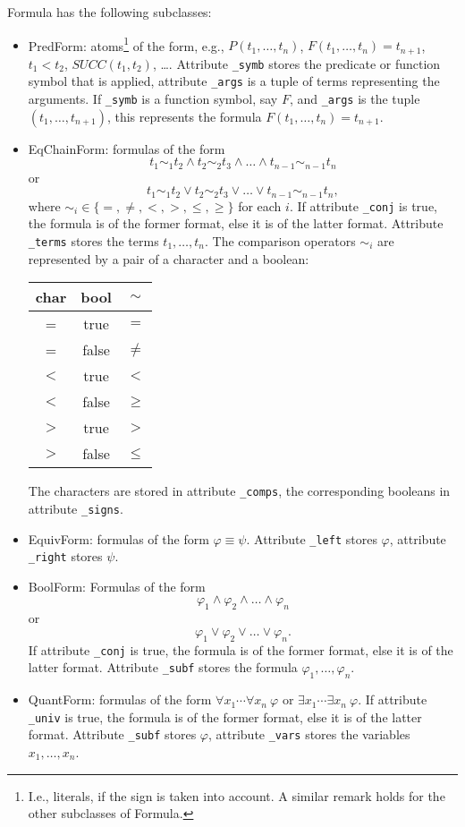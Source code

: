 \documentclass{article}
\begin{document}
Formula has the following subclasses:
\begin{itemize}
	\item PredForm: atoms\footnote{I.e., literals, if the sign is taken into account. A similar remark holds for the other subclasses of Formula.} of the form, e.g., $P(t_1,\ldots,t_n)$, $F(t_1,\ldots,t_n) = t_{n+1}$, $t_1 < t_2$, $SUCC(t_1,t_2)$, \ldots. Attribute \texttt{\_symb} stores the predicate or function symbol that is applied, attribute \texttt{\_args} is a tuple of terms representing the arguments. If \texttt{\_symb} is a function symbol, say $F$, and \texttt{\_args} is the tuple $(t_1, \ldots, t_{n+1})$, this represents the formula $F(t_1,\ldots,t_n) = t_{n+1}$.
	\item EqChainForm: formulas of the form 
		\[ t_1 \sim_1 t_2 \land t_2 \sim_2 t_3 \land \ldots \land t_{n-1} \sim_{n-1} t_n  \]
		or
		\[ t_1 \sim_1 t_2 \lor t_2 \sim_2 t_3 \lor \ldots \lor t_{n-1} \sim_{n-1} t_n,  \]
		where $\sim_i \in \{ =, \neq, <, >, \leq, \geq \}$ for each $i$. If attribute \texttt{\_conj} is true, the formula is of the former format, else it is of the latter format. Attribute \texttt{\_terms} stores the terms $t_1,\ldots,t_n$. The comparison operators $\sim_i$ are represented by a pair of a character and a boolean:
		\begin{center}
			\begin{tabular}{cc|c}
				char & bool & $\sim$ \\
				\hline
				= & true & $=$ \\
				= & false & $\neq$ \\
				$<$ & true & $<$ \\
				$<$ & false & $\geq$ \\
				$>$ & true & $>$ \\
				$>$ & false & $\leq$ 
			\end{tabular}
		\end{center}
		The characters are stored in attribute \texttt{\_comps}, the corresponding booleans in attribute \texttt{\_signs}.
	\item EquivForm: formulas of the form $\varphi \equiv \psi$. Attribute \texttt{\_left} stores $\varphi$, attribute \texttt{\_right} stores $\psi$.
	\item BoolForm: Formulas of the form
		\[ \varphi_1 \land \varphi_2 \land \ldots \land \varphi_n \]
		or
		\[ \varphi_1 \lor \varphi_2 \lor \ldots \lor \varphi_n. \]
		If attribute \texttt{\_conj} is true, the formula is of the former format, else it is of the latter format. Attribute \texttt{\_subf} stores the formula $\varphi_1,\ldots,\varphi_n$.
	\item QuantForm: formulas of the form $\forall x_1 \cdots \forall x_n\ \varphi$ or $\exists x_1 \cdots \exists x_n\ \varphi$. If attribute \texttt{\_univ} is true, the formula is of the former format, else it is of the latter format. Attribute \texttt{\_subf} stores $\varphi$, attribute \texttt{\_vars} stores the variables $x_1,\ldots,x_n$.
\end{itemize}
\end{document}
